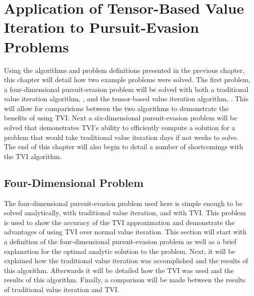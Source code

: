 \chapter{Application of Tensor-Based Value Iteration to Pursuit-Evasion Problems}\label{chp:examples}
Using the algorithms and problem definitions presented in the previous chapter, this chapter will detail how two example problems were solved. The first problem, a four-dimensional pursuit-evasion problem will be solved with both a traditional value iteration algorithm, , and the tensor-based value iteration algorithm, . This will allow for comparisions between the two algorithms to demonstrate the benefits of using TVI. Next a six-dimensional pursuit-evasion problem will be solved that demonstrates TVI's ability to efficiently compute a solution for a problem that would take traditional value iteration days if not weeks to solve. The end of this chapter will also begin to detail a number of shortcomings with the TVI algorithm.  

\section{Four-Dimensional Problem}
The four-dimensional pursuit-evasion problem used here is simple enough to be solved analytically, with traditional value iteration, and with TVI. This problem is used to show the accuracy of the TVI approximation and demonstrate the advantages of using TVI over normal value iteration. This section will start with a definition of the four-dimensional pursuit-evasion problem as well as a brief explanation for the optimal analytic solution to the problem. Next, it will be explained how the traditional value iteration was accomplished and the results of this algorithm. Afterwards it will be detailed how the TVI was used and the results of this algorithm. Finally, a comparison will be made between the results of traditional value iteration and TVI.   
